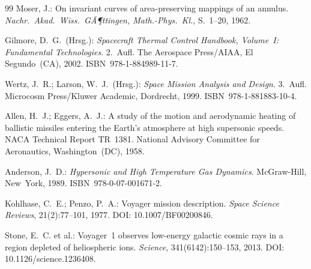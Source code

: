 ﻿\documentclass[a4paper,12pt,twoside]{article}
\theoremstyle{plain}
\theoremstyle{definition}
\theoremstyle{remark}
\begin{document}
\begin{thebibliography}{99}
	Moser, J.:
	On invariant curves of area-preserving mappings of an annulus.
	\textit{Nachr.\ Akad.\ Wiss.\ GÃ¶ttingen, Math.-Phys.\ Kl.},
	S.~1--20, 1962.

	Gilmore, D.~G.\ (Hrsg.):
	\textit{Spacecraft Thermal Control Handbook, Volume~I:
	Fundamental Technologies}.
	2.~Aufl. The Aerospace Press/AIAA, El Segundo~(CA), 2002.
	ISBN~978-1-884989-11-7.

	Wertz, J.~R.; Larson, W.~J.\ (Hrsg.):
	\textit{Space Mission Analysis and Design}.
	3.~Aufl. Microcosm Press/Kluwer Academic, Dordrecht, 1999.
	ISBN~978-1-881883-10-4.

	Allen, H.~J.; Eggers, A.~J.:
	A study of the motion and aerodynamic heating of ballistic missiles
	entering the Earth's atmosphere at high supersonic speeds.
	NACA Technical Report TR~1381.
	National Advisory Committee for Aeronautics, Washington~(DC), 1958.

	Anderson, J.~D.:
	\textit{Hypersonic and High Temperature Gas Dynamics}.
	McGraw-Hill, New~York, 1989.
	ISBN~978-0-07-001671-2.

	Kohlhase, C.~E.; Penzo, P.~A.:
	Voyager mission description.
	\textit{Space Science Reviews}, 21(2):77--101, 1977.
	DOI: 10.1007/BF00200846.

	Stone, E.~C. et al.:
	Voyager~1 observes low-energy galactic cosmic rays in a region depleted of
	heliospheric ions.
	\textit{Science}, 341(6142):150--153, 2013.
	DOI: 10.1126/science.1236408.

	\end{thebibliography}
\end{document}
